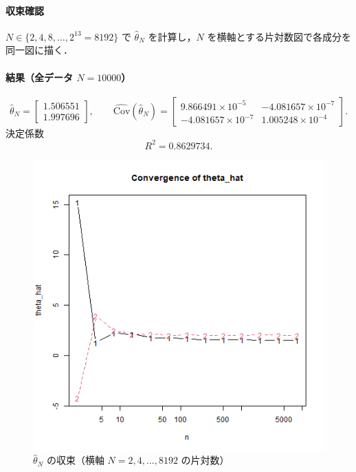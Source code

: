 \paragraph{収束確認}
$N\in\{2,4,8,\dots,2^{13}=8192\}$ で $\hat\theta_N$ を計算し，$N$ を横軸とする片対数図で各成分を同一図に描く．

\paragraph{結果（全データ $N=10000$）}
\[
\hat\theta_{N}=
\begin{bmatrix}
1.506551\\
1.997696
\end{bmatrix},\qquad
\widehat{\mathrm{Cov}}(\hat\theta_{N})=
\begin{bmatrix}
9.866491\times10^{-5} & -4.081657\times10^{-7}\\
-4.081657\times10^{-7} & 1.005248\times10^{-4}
\end{bmatrix}.
\]
決定係数
\[
R^2=0.8629734 .
\]

\begin{figure}[H]
  \centering
  \includegraphics[width=0.75\linewidth]{graphs/task1.png}
  \caption{$\hat\theta_N$ の収束（横軸 $N=2,4,\dots,8192$ の片対数）}
  \label{fig:task1-conv}
\end{figure}

